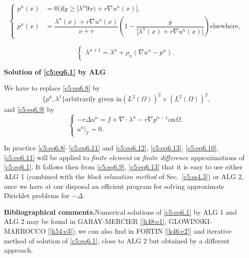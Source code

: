 \begin{equation}
\begin{cases}
p^n (x) &= 0 (\text{if} g \ge | \lambda^n 9x) + r \nabla u^n (x) |, \\
p^n (x) &= \dfrac{\lambda^n (x) + r \nabla u^n (x)}{\nu + r} \left(1- \dfrac{g}
{|\lambda^n (x) + r \nabla u^n (x) |}\right) \text{elsewhere, } 
\tag{6.10}\label{c5:eq6.10}
\end{cases}
\end{equation}

\begin{equation}
\begin{cases}
\lambda^{n+1} = \lambda^n + \rho_n (\nabla u^n - p^n). 
\tag{6.11}\label{c5:eq6.11}
\end{cases}
\end{equation}

\noindent \textbf{Solution of \eqref{c5:eq6.1} by ALG}

We have to replace \eqref{c5:eq6.8} by
\begin{equation}
\{ p^0, \lambda^1 \} \text{arbitrarily given in} (L^2 (\Omega ))^2 \times 
(L^2 (\Omega ))^2, \tag{6.12}\label{c5:eq6.12}
\end{equation}
and \eqref{c5:eq6.9} by 
\begin{equation}
\begin{cases}
-r \Delta u^n = f + \nabla \cdot \lambda^n - r \nabla p^{n-1}
\text{on}\Omega. \\ 
u^n |_\Gamma = 0. \tag{6.13}\label{c5:eq6.13}
\end{cases}
\end{equation}

\begin{remark}\label{c5:rem6.1}%
 In practice \eqref{c5:eq6.8}--\eqref{c5:eq6.11} and 
 \eqref{c5:eq6.12}, \eqref{c5:eq6.13}, \eqref{c5:eq6.10},\break 
 \eqref{c5:eq6.11} will be applied to {\em finite  element} or {\em 
 finite difference} approximations of \eqref{c5:eq6.1}. It follows then 
 from \eqref{c5:eq6.9}, \eqref{c5:eq6.13} that it is easy to use either 
 ALG 1 (combined with the {\em block relaxation method} of 
 Sec.~\ref{c5:ss4.3}) or ALG 2, once we have at our disposal an 
 efficient program for solving approximate Dirichlet problems for $-\Delta$.  
\end{remark}

\noindent
\textbf{Bibliographical comments.}\pageoriginale   Numerical solutions
of \eqref{c5:eq6.1} by ALG 1 and ALG 2 may be found in GABAY-MERCIER
[\ref{k48:e1}, GLOWINSKI-MARROCCO [\ref{k54:e3}]; we can also find in
  FORTIN [\ref{k46:e2}] and 
  iterative method of solution of \eqref{c5:eq6.1},  close to ALG 2
  but obtained by a different approach.  

